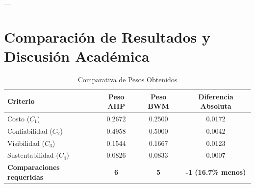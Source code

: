 \documentclass[11pt, letterpaper]{article}
\begin{document}
---

\section{Comparación de Resultados y Discusión Académica}

\begin{table}[h]
    \centering
    \caption{Comparativa de Pesos Obtenidos}
    \begin{tabular}{lccc}
        \toprule
        \textbf{Criterio} & \textbf{Peso AHP} & \textbf{Peso BWM} & \textbf{Diferencia Absoluta} \\
        \midrule
        Costo ($C_1$) & 0.2672 & 0.2500 & 0.0172 \\
        Confiabilidad ($C_2$) & 0.4958 & 0.5000 & 0.0042 \\
        Visibilidad ($C_3$) & 0.1544 & 0.1667 & 0.0123 \\
        Sustentabilidad ($C_4$) & 0.0826 & 0.0833 & 0.0007 \\
        \midrule
        \textbf{Comparaciones requeridas} & \textbf{6} & \textbf{5} & \textbf{-1 (16.7\% menos)} \\
        \bottomrule
    \end{tabular}
\end{table}
\end{document}

